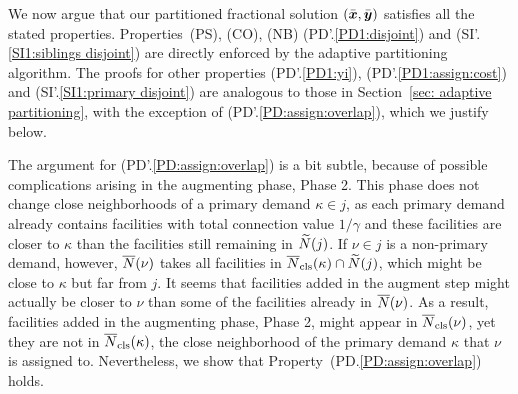 
\medskip

We now argue that our partitioned fractional solution $(\bar{\boldsymbol{x}},\bar{\boldsymbol{y}})$
satisfies all the stated properties. Properties~(PS), (CO), (NB)
(PD'.\ref{PD1:disjoint}) and (SI'.\ref{SI1:siblings disjoint}) are
directly enforced by the adaptive partitioning algorithm. The proofs
for other properties (PD'.\ref{PD1:yi}), (PD'.\ref{PD1:assign:cost})
and (SI'.\ref{SI1:primary disjoint}) are analogous to those in
Section~\ref{sec: adaptive partitioning}, with the exception of
(PD'.\ref{PD:assign:overlap}), which we justify below.


The argument for (PD'.\ref{PD:assign:overlap}) is a bit subtle, because
of possible complications arising in the augmenting phase, Phase 2.
This phase does not change close neighborhoods of a primary demand $\kappa\in j$, as
each primary demand already contains facilities with
total connection value $1/\gamma$ and these facilities are closer to $\kappa$ than
the facilities still remaining in ${\widetilde N}(j)$.
If $\nu\in j$ is a non-primary demand, however,
${\overline{N}}(\nu)$ takes all facilities in
${\overline{N}}_{\text{cls}}(\kappa)\cap {\widetilde N}(j)$, which might be close to $\kappa$
but far from $j$.  It seems that facilities added in the augment step
might actually be closer to $\nu$ than some of the facilities already
in ${\overline{N}}(\nu)$. As a result, facilities added in the augmenting
phase, Phase 2, might appear in ${\overline{N}}_{\text{cls}}(\nu)$, yet they are not in
${\overline{N}}_{\text{cls}}(\kappa)$, the close neighborhood of the primary demand
$\kappa$ that $\nu$ is assigned to.  Nevertheless, we show that
Property~(PD.\ref{PD:assign:overlap}) holds.

